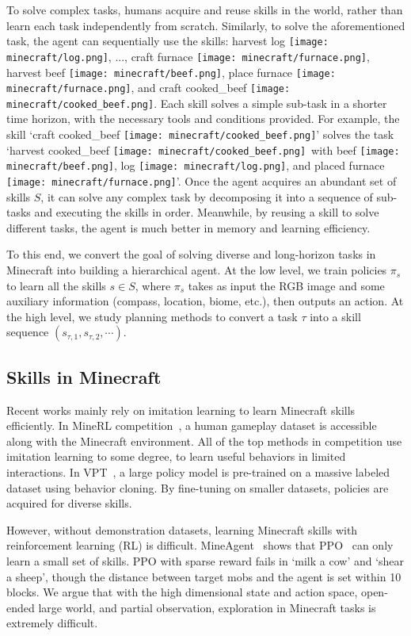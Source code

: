 \documentclass{article}
\newcommand{\mcbeef}{\texttt{[image: minecraft/beef.png]}}
\newcommand{\mccookedbeef}{\texttt{[image: minecraft/cooked\_beef.png]}}
\newcommand{\mcfurnace}{\texttt{[image: minecraft/furnace.png]}}
\newcommand{\mclog}{\texttt{[image: minecraft/log.png]}}
\begin{document}
To solve complex tasks, humans acquire and reuse skills in the world, rather than learn each task independently from scratch. Similarly, to solve the aforementioned task, the agent can sequentially use the skills: harvest log \mclog, ..., craft furnace \mcfurnace, harvest beef \mcbeef, place furnace \mcfurnace, and craft cooked\_beef \mccookedbeef. 
Each skill solves a simple sub-task in a shorter time horizon, with the necessary tools and conditions provided. For example, the skill `craft cooked\_beef \mccookedbeef' solves the task `harvest cooked\_beef \mccookedbeef \ with beef \mcbeef, log \mclog, and placed furnace \mcfurnace'. 
Once the agent acquires an abundant set of skills $S$, it can solve any complex task by decomposing it into a sequence of sub-tasks and executing the skills in order. Meanwhile, by reusing a skill to solve different tasks, the agent is much better in memory and learning efficiency.

To this end, we convert the goal of solving diverse and long-horizon tasks in Minecraft into building a hierarchical agent. At the low level, we train policies $\pi_s$ to learn all the skills $s\in S$, where $\pi_s$ takes as input the RGB image and some auxiliary information (compass, location, biome, etc.), then outputs an action. At the high level, we study planning methods to convert a task $\tau$ into a skill sequence $(s_{\tau,1}, s_{\tau,2}, \cdots)$.

\subsection{Skills in Minecraft}


Recent works mainly rely on imitation learning to learn Minecraft skills efficiently. In MineRL competition~\citep{minerl2021}, a human gameplay dataset is accessible along with the Minecraft environment. All of the top methods in competition use imitation learning to some degree, to learn useful behaviors in limited interactions. In VPT~\citep{vpt}, a large policy model is pre-trained on a massive labeled dataset using behavior cloning. By fine-tuning on smaller datasets, policies are acquired for diverse skills. 

However, without demonstration datasets, learning Minecraft skills with reinforcement learning (RL) is difficult. MineAgent~\citep{minedojo} shows that PPO~\citep{ppo} can only learn a small set of skills. PPO with sparse reward fails in `milk a cow' and `shear a sheep', though the distance between target mobs and the agent is set within 10 blocks. We argue that with the high dimensional state and action space, open-ended large world, and partial observation, exploration in Minecraft tasks is extremely difficult.
\end{document}
